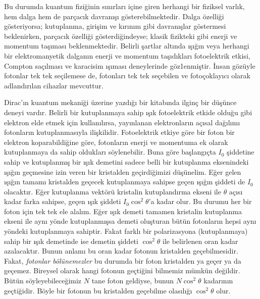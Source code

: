 \documentclass[00_kitap.tex]{subfiles}
\begin{document}
Bu durumda kuantum fiziğinin sınırları içine giren herhangi bir fiziksel varlık, hem dalga hem de parçacık davranışı gösterebilmektedir. Dalga özelliği gösteriyorsa; kutuplanma, girişim ve kırınım gibi davranışlar göstermesi beklenirken, parçacık özelliği gösterdiğindeyse; klasik fizikteki gibi enerji ve momentum taşıması beklenmektedir. Belirli şartlar altında ışığın veya herhangi bir elektromanyetik dalganın enerji ve momentum taşıdıkları fotoelektrik etkisi, Compton saçılması ve karacisim ışıması deneylerinde göz1enmiştir. İnsan gözüyle fotonlar tek tek seçilemese de, fotonları tek tek seçebilen ve fotoçoklayıcı \cite{book:Gasiorowicz} olarak adlandırılan cihazlar mevcuttur. 

Dirac'ın kuantum mekaniği üzerine yazdığı bir kitabında ilginç bir düşünce deneyi vardır. Belirli bir kutuplanmaya sahip ışık fotoelektrik etkide olduğu gibi elektron elde etmek için kullanılırsa, yayınlanan elektronların açısal dağılımı fotonların kutuplanmasıyla ilişkilidir. Fotoelektrik etkiye göre bir foton bir elektron koparabildiğine göre, fotonların enerji ve momentuma ek olarak kutuplanmaya da sahip oldukları söylenebilir. Buna göre başlangıçta $I_0$ şiddetine sahip ve kutuplanmış bir ışık demetini sadece belli bir kutuplanma eksenindeki ışığın geçmesine izin veren bir kristalden geçirdiğimizi düşünelim. Eğer gelen ışığın tamamı kristalden geçecek kutuplanmaya sahipse geçen ışığın şiddeti de $I_0$ olacaktır. Eğer kutuplanma vektörü kristalin kutuplandırma ekseni ile $\theta$ açısı kadar farka sahipse, geçen ışık şiddeti $I_0 \cos^2 \theta$'a kadar olur. Bu durumu her bir foton için tek tek ele alalım. Eğer ışık demeti tamamen kristalin kutuplanma ekseni ile aynı yönde kutuplanmışsa demeti oluşturan bütün fotonların hepsi aynı yöndeki kutuplanmaya sahiptir. Fakat farklı bir polarizasyona (kutuplanmaya) sahip bir ışık demetinde ise demetin şiddeti  $\cos^2 \theta$ ile belirlenen oran kadar azalacaktır. Bunun anlamı bu oran kadar fotonun kristalden geçebilmesidir. Fakat, \emph{fotonlar bölünemezler} bu durumda bir foton kristalden ya geçer ya da geçemez. Bireysel olarak hangi fotonun geçtiğini bilmemiz mümkün değildir. Bütün söyleyebileceğimiz $N$ tane foton geldiyse, bunun $N \cos^2 \theta$ kadarının geçtiğidir. Böyle bir fotonun bu kristalden geçebilme olasılığı $\cos^2\theta$ olur.
\end{document}
